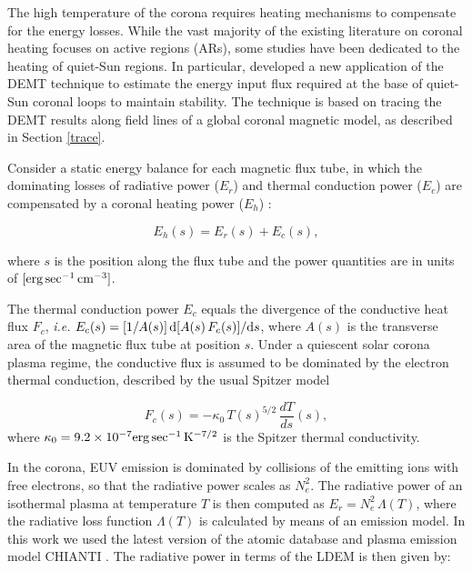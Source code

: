 \documentclass[namedreferences]{solarphysics}
\begin{document}
\begin{article}
{The high temperature of the corona requires heating mechanisms to compensate for the energy losses. While the vast majority of the existing literature on coronal heating focuses on active regions (ARs), some studies have been dedicated to the heating of quiet-Sun regions. In particular, \citet{maccormack_2017} developed a new application of the DEMT technique to estimate the energy input flux required at the base of quiet-Sun coronal loops to maintain stability. The technique is based on tracing the DEMT results along field lines of a global coronal magnetic model, as described in Section \ref{trace}.}

{Consider} a static energy balance for each magnetic flux tube, {in which the dominating losses of} radiative power ($E_r$) and thermal conduction power ($E_c$) are compensated {by a} coronal heating power ($E_h$) \citep{aschwanden_2004}:

\begin{equation}\label{Balance}
E_h(s) = E_r(s) + E_c(s),
\end{equation}

\noindent
where $s$ is the position along {the flux tube} and the {power quantities} are in units of $[{\rm erg\,sec^{-1}\,cm^{-3}}]$.

{The thermal conduction power $E_c$ equals the divergence of the conductive heat flux $F_c$, \textit{i.e.} $E_c(s)=[1/A(s)]\,{\rm d}[A(s)\,F_c(s)]/{\rm d}s$, where $A(s)$ is the transverse area of the magnetic flux tube at position $s$. Under a quiescent solar corona plasma regime, the conductive flux is assumed to be dominated by the electron thermal conduction, described by the usual Spitzer model \citep{spitzer_1962}

\begin{equation}\label{Fc}
F_c(s)=-\kappa_0\,{T(s)}^{5/2}\,\frac{dT}{ds}(s),
\end{equation}
where $\kappa_0 = 9.2 \times 10^{-7}  {\rm erg\,sec^{-1}\,K^{-7/2}}$ is the Spitzer thermal conductivity.}

{In the corona, EUV emission is dominated by collisions of the emitting ions with free electrons, so that the radiative power scales as $N_e^2$. The radiative power of an isothermal plasma at temperature $T$ is then computed as $E_r=N_e^2\,\Lambda(T)$, where the radiative loss function $\Lambda(T)$ is calculated by means of an emission model. In this work we used the latest version of the atomic database and plasma emission model CHIANTI \citep{delzanna_2015}. The radiative power in terms of the LDEM is then given by:}


\end{article}
\end{document}
